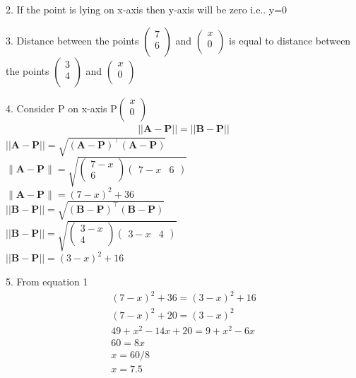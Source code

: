 \documentclass[journal,10pt,twocolumn]{article}
\newcommand{\myvec}[1]{\ensuremath{\begin{pmatrix}#1\end{pmatrix}}}
\let\vec\mathbf
\begin{document}
\raggedright 2. If the point is lying on x-axis then y-axis will be zero i.e.. y=0


\raggedright 3. Distance between the points  $\begin{pmatrix}
  7 \\
  6 \\
 \end{pmatrix}$ and $\begin{pmatrix}
  x \\
  0 \\
 \end{pmatrix}$ is equal to distance between the points $\begin{pmatrix}
  3 \\
  4 \\
 \end{pmatrix}$ and $\begin{pmatrix}
  x \\
  0 \\
 \end{pmatrix}$\\ 	     

\raggedright 4. Consider P on x-axis P$\begin{pmatrix}
  x \\
  0 \\
 \end{pmatrix}$           \vspace{3mm}
\begin{align}
	||\vec{A-P}|| = ||\vec{B-P}||
\end{align}  
    $||\vec{A-P}|| = \vec{\sqrt{{(A-P)}^{\top}{(A-P)}}}$\\
    
$ \vec{\|A-P\|} = \sqrt{\myvec{7-x\\6}\myvec{7-x & 6}}$ \\
$ \vec{\|A-P\|} = (7-x)^2+36$ \\
    $||\vec{B-P}|| =  \vec{\sqrt{{(B-P)}^{\top}{(B-P)}}}$\\   
    $||\vec{B-P}|| = \sqrt{\myvec{3-x\\4}\myvec{3-x & 4}}$\\
    $||\vec{B-P}|| = (3-x)^2+16$ \\
    \vspace{1mm}
 \raggedright 5. From equation 1 
 \\
    \vspace{1mm}            
\begin{gather*}
 (7-x)^2+36=(3-x)^2+16\\                      
 (7-x)^2+20=(3-x)^2\\                         
 49+x^2-14x+20=9+x^2-6x\\                     
 60=8x\\                                    
 x=60/8\\                               
 x=7.5   
\end{gather*}               			
\end{document}

